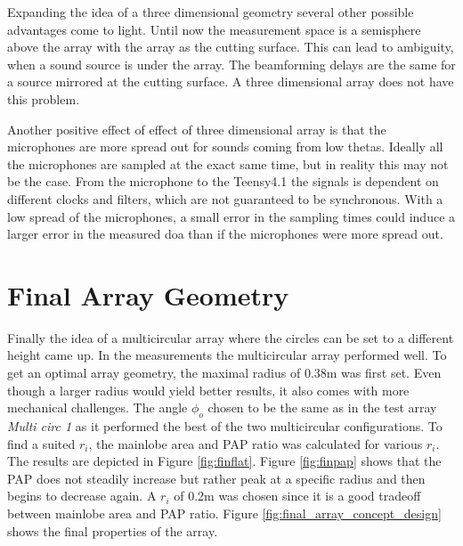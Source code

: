 Expanding the idea of a three dimensional geometry several other
possible advantages come to light.
Until now the measurement space is a semisphere above the array with the array as the cutting surface.
This can lead to ambiguity, when a sound source is under the array.
The beamforming delays are the same for a source mirrored at the cutting surface.
A three dimensional array does not have this problem.

Another positive effect of effect of three dimensional array is
that the microphones are more spread out for sounds
coming from low thetas.
Ideally all the microphones are sampled at the exact same time, but in
reality this may not be the case.
From the microphone to the Teensy4.1 the signals is dependent on different clocks and
filters, which are not guaranteed to be synchronous.
With a low spread of the microphones, a small error in the sampling times could
induce a larger error in the measured \acrshort{doa} than if
the microphones were more spread out.


\newpage
\section{Final Array Geometry} \label{sec:final_array_geometry}
Finally the idea of a multicircular array where the circles can be
set to a different height came up.
In the measurements the multicircular array performed well.
To get an optimal array geometry, the maximal radius of 0.38m was first set.
Even though a larger radius would yield better results, it also
comes with more mechanical challenges.
The angle $\phi_o$ chosen to be the same as in the test array
\textit{Multi circ 1} as it performed the best of the two multicircular
configurations.
To find a suited $r_i$, the mainlobe area and PAP ratio was calculated for
various $r_i$.
The results are depicted in Figure \ref{fig:finflat}.
Figure \ref{fig:finpap} shows that the PAP does not
steadily increase but rather peak at a specific radius and then
begins to decrease again.
A $r_i$ of 0.2m was chosen since it is a good tradeoff between
mainlobe area and PAP ratio.
Figure \ref{fig:final_array_concept_design} shows the final
properties of the array.

